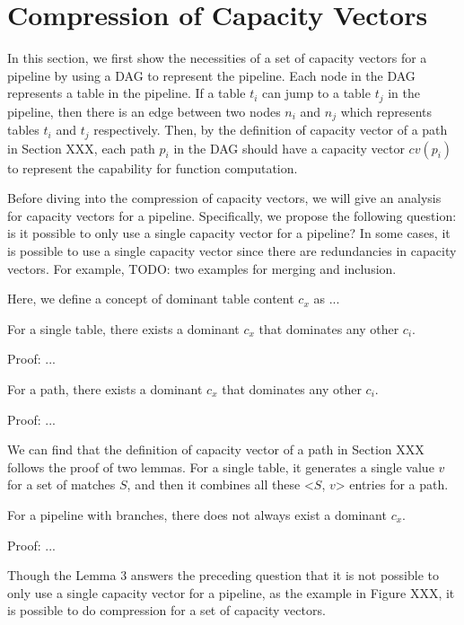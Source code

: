 \section{Compression of Capacity Vectors}

In this section, we first show the necessities of a set of capacity vectors for a pipeline by using a DAG to represent the pipeline. Each node in the DAG represents a table in the pipeline. If a table $t_i$ can jump to a table $t_j$ in the pipeline, then there is an edge between two nodes $n_i$ and $n_j$ which represents tables $t_i$ and $t_j$ respectively. Then, by the definition of capacity vector of a path in Section XXX, each path $p_i$ in the DAG should have a capacity vector $cv(p_i)$ to represent the capability for function computation.

Before diving into the compression of capacity vectors, we will give an analysis for capacity vectors for a pipeline. Specifically, we propose the following question: is it possible to only use a single capacity vector for a pipeline? In some cases, it is possible to use a single capacity vector since there are redundancies in capacity vectors. For example, TODO: two examples for merging and  inclusion.

Here, we define a concept of dominant table content $c_x$ as ...

\begin{lemma}
For a single table, there exists a dominant $c_x$ that dominates any other $c_i$.
\end{lemma}

Proof: ...

\begin{lemma}
For a path, there exists a dominant $c_x$ that dominates any other $c_i$.
\end{lemma}

Proof: ...

We can find that the definition of capacity vector of a path in Section XXX follows the proof of two lemmas. For a single table, it generates a single value $v$ for a set of matches $S$, and then it combines all these <$S$, $v$> entries for a path.

\begin{lemma}
For a pipeline with branches, there does not always exist a dominant $c_x$.
\end{lemma}
 
Proof: ...

Though the Lemma 3 answers the preceding question that it is not possible to only use a single capacity vector for a pipeline, as the example in Figure XXX, it is possible to do compression for a set of capacity vectors.

